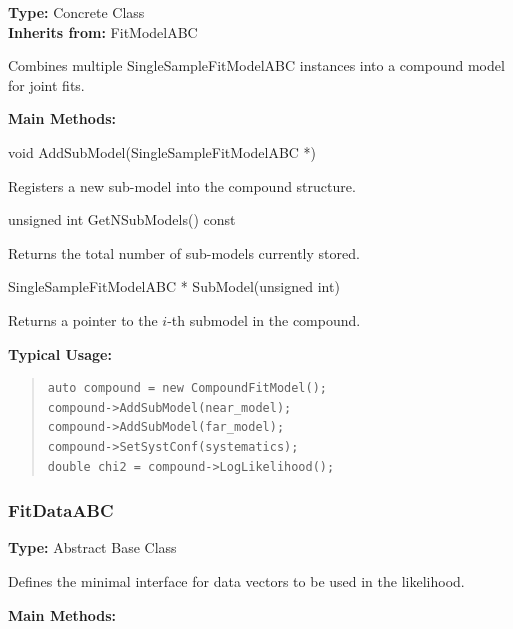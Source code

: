 \textbf{Type:} Concrete Class \\
\textbf{Inherits from:} {\color{cadmiumgreen} FitModelABC}

Combines multiple {\color{cadmiumgreen} SingleSampleFitModelABC} instances into a compound model for joint fits.

\vspace{0.5em}
\noindent\textbf{Main Methods:}

\begin{description}[align=left]

  \item[] {\color{cadmiumred} void AddSubModel(SingleSampleFitModelABC *)}

  Registers a new sub-model into the compound structure.

  \item[] {\color{cadmiumred} unsigned int GetNSubModels() const}

  Returns the total number of sub-models currently stored.

  \item[] {\color{cadmiumred} SingleSampleFitModelABC * SubModel(unsigned int)}

  Returns a pointer to the $i$-th submodel in the compound.

\end{description}

\vspace{0.5em}
\noindent\textbf{Typical Usage:}

\begin{quote}
\begin{lstlisting}
auto compound = new CompoundFitModel();
compound->AddSubModel(near_model);
compound->AddSubModel(far_model);
compound->SetSystConf(systematics);
double chi2 = compound->LogLikelihood();
\end{lstlisting}
\end{quote}

\vspace{1em}
\subsubsection*{\color{cadmiumgreen}\bf FitDataABC}

\textbf{Type:} Abstract Base Class

Defines the minimal interface for data vectors to be used in the likelihood.

\vspace{0.5em}
\noindent\textbf{Main Methods:}

